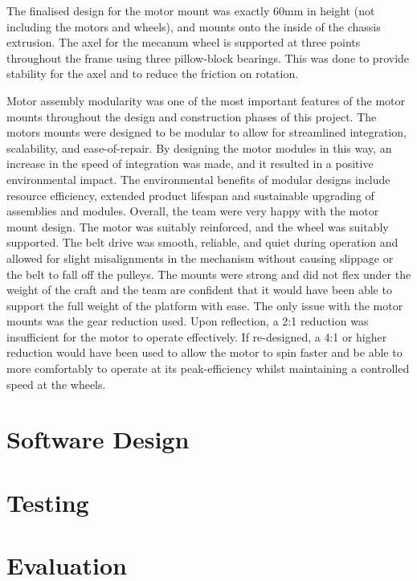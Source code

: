 \documentclass [12pt]{article}
\begin{document}
The finalised design for the motor mount was exactly 60mm in height (not including the motors and wheels), and mounts onto the inside of the chassis extrusion. The axel for the mecanum wheel is supported at three points throughout the frame using three pillow-block bearings. This was done to provide stability for the axel and to reduce the friction on rotation.


Motor assembly modularity was one of the most important features of the motor mounts throughout the design and construction phases of this project. The motors mounts were designed to be modular to allow for streamlined integration, scalability, and ease-of-repair. By designing the motor modules in this way, an increase in the speed of integration was made, and it resulted in a positive environmental impact. The environmental benefits of modular designs include resource efficiency, extended product lifespan and sustainable upgrading of assemblies and modules.
Overall, the team were very happy with the motor mount design. The motor was suitably reinforced, and the wheel was suitably supported. The belt drive was smooth, reliable, and quiet during operation and allowed for slight misalignments in the mechanism without causing slippage or the belt to fall off the pulleys. The mounts were strong and did not flex under the weight of the craft and the team are confident that it would have been able to support the full weight of the platform with ease. The only issue with the motor mounts was the gear reduction used. Upon reflection, a 2:1 reduction was insufficient for the motor to operate effectively. If re-designed, a 4:1 or higher reduction would have been used to allow the motor to spin faster and be able to more comfortably to operate at its peak-efficiency whilst maintaining a controlled speed at the wheels.




\newpage
\section{Software Design}

\newpage
\section{Testing}

\newpage
\section{Evaluation}
\end{document}
